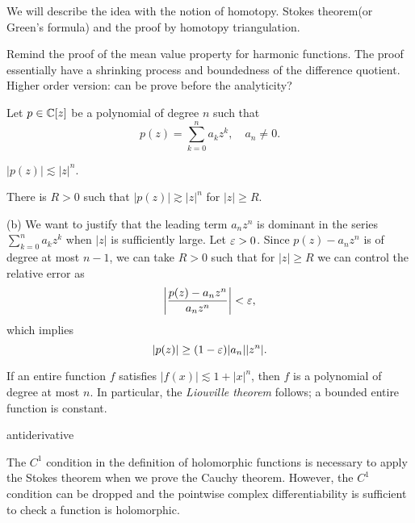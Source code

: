 \documentclass{../note}
\begin{document}
\begin{prb}
We will describe the idea with the notion of homotopy.
Stokes theorem(or Green's formula) and the proof by homotopy triangulation.
\end{prb}
\begin{prb}
Remind the proof of the mean value property for harmonic functions.
The proof essentially have a shrinking process and boundedness of the difference quotient.
Higher order version: can be prove before the analyticity?
\end{prb}



\begin{prb}
Let $p\in\mathbb{C}[z]$ be a polynomial of degree $n$ such that
\[p(z)=\sum_{k=0}^na_kz^k,\quad a_n\ne0.\]
\begin{parts}
\item $|p(z)|\lesssim|z|^n$.
\item There is $R>0$ such that $|p(z)|\gtrsim|z|^n$ for $|z|\ge R$.
\end{parts}
\end{prb}
\begin{pf}
(b)
We want to justify that the leading term $a_nz^n$ is dominant in the series $\sum_{k=0}^na_kz^k$ when $|z|$ is sufficiently large.
Let $\varepsilon>0$.
Since $p(z)-a_nz^n$ is of degree at most $n-1$, we can take $R>0$ such that for $|z|\ge R$ we can control the relative error as
\[\left|\frac{p(z)-a_nz^n}{a_nz^n}\right|<\varepsilon,\]
which implies
\[|p(z)|\ge(1-\varepsilon)|a_n||z^n|.\]
\end{pf}


\begin{prb}
\begin{parts}
\item If an entire function $f$ satisfies $|f(x)|\lesssim1+|x|^n$, then $f$ is a polynomial of degree at most $n$. In particular, the \emph{Liouville theorem} follows; a bounded entire function is constant.
\end{parts}
\end{prb}

\begin{prb}
antiderivative
\end{prb}

\begin{prb}
The $C^1$ condition in the definition of holomorphic functions is necessary to apply the Stokes theorem when we prove the Cauchy theorem.
However, the $C^1$ condition can be dropped and the pointwise complex differentiability is sufficient to check a function is holomorphic.
\end{prb}
\end{document}
